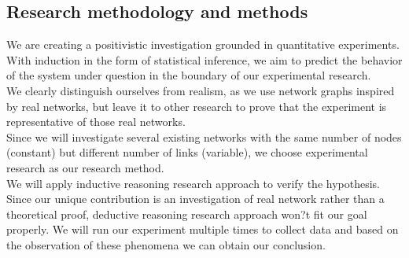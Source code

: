 \subsection{Research methodology and methods}
We are creating a positivistic investigation grounded in quantitative experiments. With induction in the form of statistical inference, we aim to predict the behavior of the system under question in the boundary of our experimental research.\\
We clearly distinguish ourselves from realism, as we use network graphs inspired by real networks, but leave it to other research to prove that the experiment is representative of those real networks.\\
Since we will investigate several existing networks with the same number of nodes (constant) but different number of links (variable), we choose experimental research as our research method.\\
We will apply inductive reasoning research approach to verify the hypothesis. Since our unique contribution is an investigation of real network rather than a theoretical proof, deductive reasoning research approach won?t fit our goal properly. We will run our experiment multiple times to collect data and based on the observation of these phenomena we can obtain our conclusion.\\
